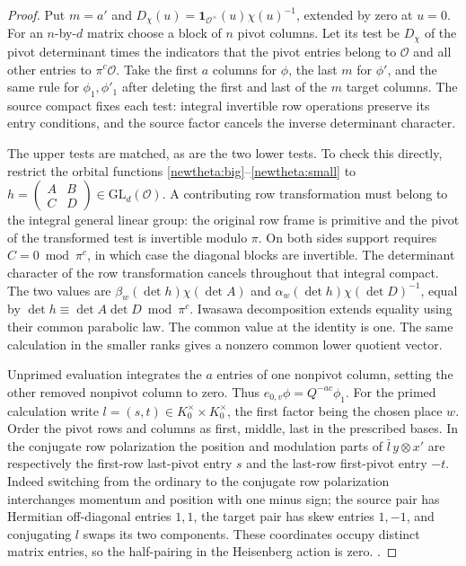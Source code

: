 \begin{proof}
Put \(m=a'\) and \(D_\chi(u)=\mathbf1_{\mathcal O^\times}(u)
\chi(u)^{-1}\), extended by zero at \(u=0\).
For an \(n\)-by-\(d\) matrix choose a block of \(n\) pivot columns.
Let its test be \(D_\chi\) of the pivot determinant times the
indicators that the pivot entries belong to \(\mathcal O\) and
all other entries to \(\pi^c\mathcal O\). Take the first \(a\)
columns for \(\phi\), the last \(m\) for \(\phi'\), and the same
rule for \(\phi_1,\phi'_1\) after deleting the first and last of
the \(m\) target columns. The source compact fixes each test:
integral invertible row operations preserve its entry conditions,
and the source factor cancels the inverse determinant character.

The upper tests are matched, as are the two lower tests. To check
this directly, restrict the orbital functions
\eqref{newtheta:big}--\eqref{newtheta:small} to
\(h=\left(\begin{smallmatrix}A&B\\ C&D\end{smallmatrix}\right)
\in\mathrm{GL}_d(\mathcal O)\).
A contributing row transformation must belong to the integral
general linear group: the original row frame is primitive and
the pivot of the transformed test is invertible modulo \(\pi\).
On both sides support requires \(C=0\bmod\pi^c\), in which case
the diagonal blocks are invertible. The determinant character of
the row transformation cancels throughout that integral compact.
The two values are \(\beta_w(\det h)\chi(\det A)\) and
\(\alpha_w(\det h)\chi(\det D)^{-1}\), equal by
\(\det h\equiv\det A\det D\bmod\pi^c\). Iwasawa decomposition
extends equality using their common parabolic law. The common value
at the identity is one. The same calculation in the smaller ranks
gives a nonzero common lower quotient vector.

Unprimed evaluation integrates the \(a\) entries of one nonpivot
column, setting the other removed nonpivot column to zero. Thus
\(e_{0,v}\phi=Q^{-ac}\phi_1\). For the primed calculation write
\(l=(s,t)\in K_0^\times\times K_0^\times\), the first factor
being the chosen place \(w\). Order the pivot rows and columns as
first, middle, last in the prescribed bases. In the conjugate row
polarization the position and modulation parts of
\(\bar l\,y\otimes x'\) are respectively the first-row last-pivot
entry \(s\) and the last-row first-pivot entry \(-t\).
Indeed switching from the ordinary to the conjugate row polarization
interchanges momentum and position with one minus sign; the source
pair has Hermitian off-diagonal entries \(1,1\), the target pair
has skew entries \(1,-1\), and conjugating \(l\) swaps its two
components. These coordinates occupy distinct matrix entries, so
the half-pairing in the Heisenberg action is zero.
.


\end{proof}
